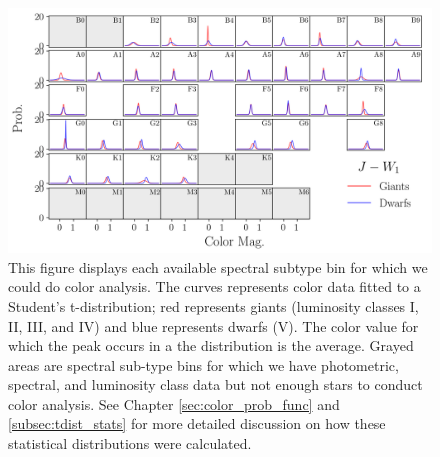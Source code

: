 \begin{figure}
    \centering
    \includegraphics[width=1.0\textwidth,clip=true]{Figures/periodic/t-pdf_J_W1-periodic.png}
    \caption{This figure displays each available spectral subtype bin for which we could do color analysis. The curves represents color data fitted to a Student's t-distribution; red represents giants (luminosity classes I, II, III, and IV) and blue represents dwarfs (V). The color value for which the peak occurs in a the distribution is the average. Grayed areas are spectral sub-type bins for which we have photometric, spectral, and luminosity class data but not enough stars to conduct color analysis. See Chapter \ref{sec:color_prob_func} and \ref{subsec:tdist_stats} for more detailed discussion on how these statistical distributions were calculated.}
    \label{fig:periodic-pdf-jw1}
\end{figure}

